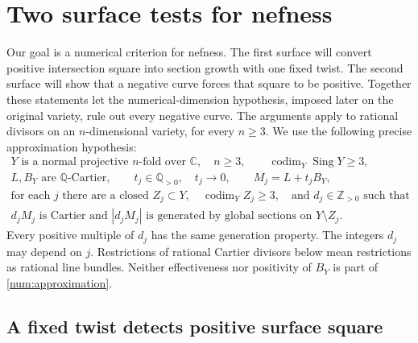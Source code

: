 \section{Two surface tests for nefness}\label{num:section}

Our goal is a numerical criterion for nefness. The first surface will
convert positive intersection square into section growth with one fixed
twist. The second surface will show that a negative curve forces that
square to be positive. Together these statements let the numerical-dimension
hypothesis, imposed later on the original variety, rule out every negative
curve. The arguments apply to rational divisors on an
\(n\)-dimensional variety, for every \(n\geq 3\).  We use the following
precise approximation hypothesis:
\begin{equation}\label{num:approximation}
\begin{gathered}
Y\text{ is a normal projective }n\text{-fold over }\mathbb C,
\quad n\geq3,
\qquad \operatorname{codim}_Y\operatorname{Sing}Y\geq 3,\\
L,B_Y\text{ are }\mathbb Q\text{-Cartier},\qquad
t_j\in\mathbb Q_{>0},\quad t_j\longrightarrow 0,
\qquad M_j=L+t_jB_Y,\\
\text{for each }j\text{ there are a closed }Z_j\subset Y,
\quad\operatorname{codim}_Y Z_j\geq 3,
\quad\text{and }d_j\in\mathbb Z_{>0}\text{ such that}\\
d_jM_j\text{ is Cartier and }|d_jM_j|
\text{ is generated by global sections on }Y\setminus Z_j.
\end{gathered}
\end{equation}
Every positive multiple of \(d_j\) has the same generation property.
The integers \(d_j\) may depend on \(j\).
Restrictions of rational Cartier divisors below mean restrictions as
rational line bundles.  Neither effectiveness nor positivity of \(B_Y\) is part
of \eqref{num:approximation}.

\subsection{A fixed twist detects positive surface square}

